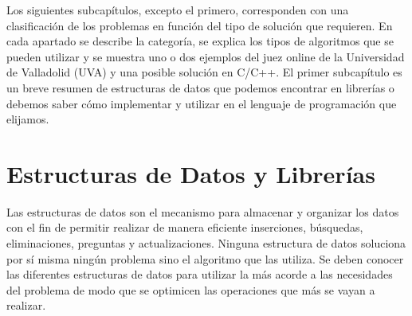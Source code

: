Los siguientes subcapítulos, excepto el primero, corresponden con una
clasificación de los problemas en función del tipo de solución que
requieren. En cada apartado se describe la categoría, se explica los
tipos de algoritmos que se pueden utilizar y se muestra uno o dos
ejemplos del juez online de la Universidad de Valladolid (UVA) y una
posible solución en C/C++. El primer subcapítulo es un breve resumen
de estructuras de datos que podemos encontrar en librerías o debemos
saber cómo implementar y utilizar en el lenguaje de programación que
elijamos.

\section{Estructuras de Datos y Librerías}
\label{sec:datos}

Las estructuras de datos son el mecanismo para almacenar y organizar
los datos con el fin de permitir realizar de manera eficiente
inserciones, búsquedas, eliminaciones, preguntas y
actualizaciones. Ninguna estructura de datos soluciona por sí misma
ningún problema sino el algoritmo que las utiliza. Se deben conocer
las diferentes estructuras de datos para utilizar la más acorde a las
necesidades del problema de modo que se optimicen las operaciones que
más se vayan a realizar.

